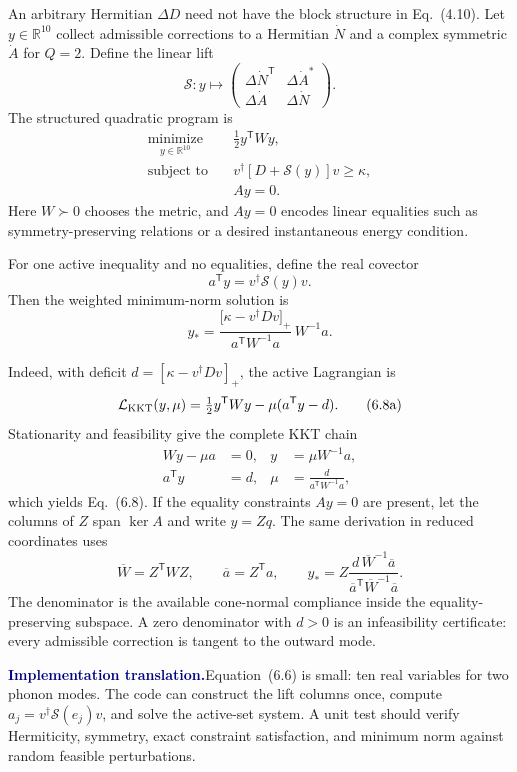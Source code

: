 \documentclass[10pt]{article}
\newcommand{\R}{\mathbb R}
\newcommand{\pedbox}[2]{%
  \par\medskip
  \noindent\colorbox{pale}{%
    \parbox{\dimexpr\linewidth-2\fboxsep\relax}{%
      \textcolor{navy}{\textbf{#1}}\quad #2%
    }%
  }\par\medskip
}
\newcommand{\implementationbox}[1]{\pedbox{Implementation translation.}{#1}}
\begin{document}
An arbitrary Hermitian \(\Delta D\) need not have the block structure in
Eq.~(4.10).  Let \(y\in\R^{10}\) collect admissible corrections to a Hermitian
\(\dot N\) and a complex symmetric \(\dot A\) for \(Q=2\).  Define the linear
lift
\[
\mathcal S:y\longmapsto
\begin{pmatrix}
\Delta\dot N^{\mathsf T}&\Delta\dot A^\ast\\
\Delta\dot A&\Delta\dot N
\end{pmatrix}.
\tag{6.5}
\]
The structured quadratic program is
\[
\begin{aligned}
\underset{y\in\R^{10}}{\text{minimize}}\quad&
\frac12 y^{\mathsf T}Wy,\\
\text{subject to}\quad&
v^\dagger\!\left[D+\mathcal S(y)\right]v\geq\kappa,\\
&Ay=0.
\end{aligned}
\tag{6.6}
\]
Here \(W\succ0\) chooses the metric, and \(Ay=0\) encodes linear equalities
such as symmetry-preserving relations or a desired instantaneous energy
condition.

For one active inequality and no equalities, define the real covector
\[
a^{\mathsf T}y=v^\dagger\mathcal S(y)v.
\tag{6.7}
\]
Then the weighted minimum-norm solution is
\[
\boxed{
y_\ast
=\frac{\bigl[\kappa-v^\dagger Dv\bigr]_+}
{a^{\mathsf T}W^{-1}a}\,W^{-1}a.
}
\tag{6.8}
\]

Indeed, with deficit
\(d=[\kappa-v^\dagger Dv]_+\), the active Lagrangian is
\[
\mathcal L_{\rm KKT}(y,\mu)
=\tfrac12y^{\mathsf T}Wy-\mu(a^{\mathsf T}y-d).
\tag{6.8a}
\]
Stationarity and feasibility give the complete KKT chain
\[
\begin{aligned}
Wy-\mu a&=0,
&y&=\mu W^{-1}a,\\
a^{\mathsf T}y&=d,
&\mu&=\frac{d}{a^{\mathsf T}W^{-1}a},
\end{aligned}
\tag{6.8b}
\]
which yields Eq.~(6.8).  If the equality constraints \(Ay=0\) are present,
let the columns of \(Z\) span \(\ker A\) and write \(y=Zq\).  The same
derivation in reduced coordinates uses
\[
\overline W=Z^{\mathsf T}WZ,\qquad
\overline a=Z^{\mathsf T}a,
\qquad
y_\ast=
Z\frac{d\,\overline W^{-1}\overline a}
{\overline a^{\mathsf T}\overline W^{-1}\overline a}.
\tag{6.8c}
\]
The denominator is the available cone-normal compliance inside the
equality-preserving subspace.  A zero denominator with \(d>0\) is an
infeasibility certificate: every admissible correction is tangent to the
outward mode.

\implementationbox{Equation~(6.6) is small: ten real variables for two
phonon modes.  The code can construct the lift columns once, compute
\(a_j=v^\dagger\mathcal S(e_j)v\), and solve the active-set system.  A unit
test should verify Hermiticity, symmetry, exact constraint satisfaction, and
minimum norm against random feasible perturbations.}
\end{document}
